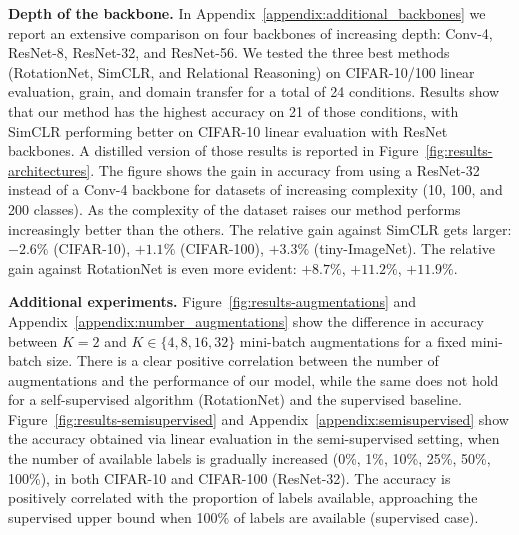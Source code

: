 \documentclass{article}
\begin{document}
\textbf{Depth of the backbone.} In Appendix~\ref{appendix:additional_backbones} we report an extensive comparison on four backbones of increasing depth: Conv-4, ResNet-8, ResNet-32, and ResNet-56. We tested the three best methods (RotationNet, SimCLR, and Relational Reasoning) on CIFAR-10/100 linear evaluation, grain, and domain transfer for a total of 24 conditions. Results show that our method has the highest accuracy on 21 of those conditions, with SimCLR performing better on CIFAR-10 linear evaluation with ResNet backbones.
A distilled version of those results is reported in Figure~\ref{fig:results-architectures}. The figure shows the gain in accuracy from using a ResNet-32 instead of a Conv-4 backbone for datasets of increasing complexity (10, 100, and 200 classes). As the complexity of the dataset raises our method performs increasingly better than the others. The relative gain against SimCLR gets larger: $-2.6\%$ (CIFAR-10), $+1.1\%$ (CIFAR-100), $+3.3\%$ (tiny-ImageNet). The relative gain against RotationNet is even more evident: $+8.7\%$, $+11.2\%$, $+11.9\%$.

\textbf{Additional experiments.}
Figure~\ref{fig:results-augmentations} and Appendix~\ref{appendix:number_augmentations} show the difference in accuracy between $K=2$ and $K \in \{4, 8, 16, 32\}$ mini-batch augmentations for a fixed mini-batch size. There is a clear positive correlation between the number of augmentations and the performance of our model, while the same does not hold for a self-supervised algorithm (RotationNet) and the supervised baseline.
Figure~\ref{fig:results-semisupervised} and Appendix~\ref{appendix:semisupervised} show the accuracy obtained via linear evaluation in the semi-supervised setting, when the number of available labels is gradually increased (0\%, 1\%, 10\%, 25\%, 50\%, 100\%), in both CIFAR-10 and CIFAR-100 (ResNet-32). The accuracy is positively correlated with the proportion of labels available, approaching the supervised upper bound when 100\% of labels are available (supervised case).
\end{document}
